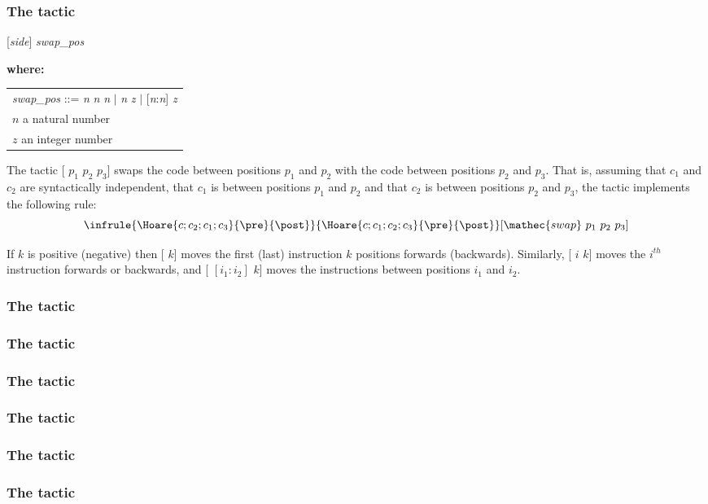 \subsubsection*{The  tactic}
%
\Syntax {} [\textit{side}] \textit{swap\_pos}

\textbf{where:} 
\begin{tabular}[t]{l}
  \textit{swap\_pos} ::= 
  \textit{n} \textit{n} \textit{n} $\mid$ \textit{n} \textit{z} $\mid$ [\textit{n}:\textit{n}] \textit{z}
  \\
  $n$ a natural number
  \\
  $z$ an integer number
\end{tabular}
  

The tactic [ $p_1$ $p_2$ $p_3$] swaps the code between
positions $p_1$ and $p_2$ with the code between positions $p_2$ and
$p_3$. That is, assuming that $c_1$ and $c_2$ are syntactically
independent, that $c_1$ is between positions $p_1$ and $p_2$ and that
$c_2$ is between positions $p_2$ and $p_3$, the tactic implements the
following rule:
\begin{displaymath}
\infrule{
  \Hoare{c;c_2;c_1;c_3}{\pre}{\post}
}{
  \Hoare{c;c_1;c_2;c_3}{\pre}{\post}
} [\mathec{swap}\ p_1\ p_2\ p_3]
\end{displaymath}

If $k$ is positive (negative) then [ $k$] moves the first
(last) instruction $k$ positions forwards (backwards). Similarly,
[ $i$ $k$] moves the $i^{th}$ instruction forwards or
backwards, and [ $[i_1:i_2]$ $k$] moves the instructions
between positions $i_1$ and $i_2$.

\subsubsection*{The  tactic}
\NotDocumented
\subsubsection*{The  tactic}
\NotDocumented
\subsubsection*{The  tactic}
\NotDocumented
\subsubsection*{The  tactic}
\NotDocumented
\subsubsection*{The  tactic}
\NotDocumented
\subsubsection*{The  tactic}
\NotDocumented



